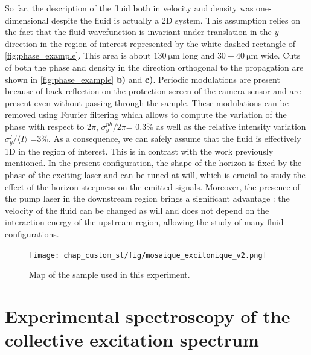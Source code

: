 So far, the description of the fluid both in velocity and density was one-dimensional despite the fluid is actually a 2D system. This assumption
relies on the fact that the fluid wavefunction is invariant under translation in the $y$ direction in the region of interest represented by the white dashed rectangle of \autoref{fig:phase_example}. This area is about $\SI{130}{\micro \meter}$ long and $30-\SI{40}{\micro \meter}$ wide. 
Cuts of both the phase and density in the direction orthogonal to the propagation are shown in \autoref{fig:phase_example} \textbf{b)} and \textbf{c)}. Periodic modulations are present because of back reflection on the protection screen of the camera sensor and are present even without passing through the sample. These modulations can be removed
using Fourier filtering which allows to compute the variation of the phase with respect to $2\pi$,  $\sigma_y^{ph}/2\pi$= 0.3\% as well as the relative intensity variation $\sigma_y^I/\langle I \rangle$ =3\%. As a consequence,
we can safely assume that the fluid is effectively 1D in the region of interest. This is in contrast with the work \cite{nguyen_acoustic_2015} previously mentioned. In the present configuration, the shape of the horizon is fixed by the phase of the exciting laser and can be tuned at will, which is crucial to
study the effect of the horizon steepness on the emitted signals. Moreover, the presence of the pump laser in the downstream region brings a significant advantage : the velocity of the fluid can be changed as will and does not depend on the interaction energy of the upstream region, allowing the study of many fluid configurations.
\label{sub:high_resolution_spectroscopy}

\begin{figure}[p]
    \centering
    \texttt{[image: chap\_custom\_st/fig/mosaique\_excitonique\_v2.png]}
    \caption{Map of the sample used in this experiment.}
    \label{fig:sample_map}
\end{figure}


\section{Experimental spectroscopy of the collective excitation spectrum}

